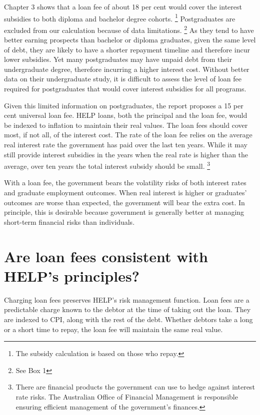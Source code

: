 \documentclass[embargoed]{grattan}
\begin{document}
Chapter 3 shows that a loan fee of about 18 per cent would cover the interest subsidies to both diploma and bachelor degree cohorts.%
\footnote{The subsidy calculation is based on those who repay.} Postgraduates are excluded from our calculation because of data limitations.%
\footnote{See Box 1} As they tend to have better earning prospects than bachelor or diploma graduates, given the same level of debt, they are likely to have a shorter repayment timeline and therefore incur lower subsidies.
Yet many postgraduates may have unpaid debt from their undergraduate degree, therefore incurring a higher interest cost.
Without better data on their undergraduate study, it is difficult to assess the level of loan fee required for postgraduates that would cover interest subsidies for all programs.

Given this limited information on postgraduates, the report proposes a 15 per cent universal loan fee.
HELP loans, both the principal and the loan fee, would be indexed to inflation to maintain their real values.
The loan fees should cover most, if not all, of the interest cost.
The rate of the loan fee relies on the average real interest rate the government has paid over the last ten years.
While it may still provide interest subsidies in the years when the real rate is higher than the average, over ten years the total interest subsidy should be small.%
\footnote{There are financial products the government can use to hedge against interest rate risks.
The Australian Office of Financial Management is responsible ensuring efficient management of the government's finances.}

With a loan fee, the government bears the volatility risks of both interest rates and graduate employment outcomes.
When real interest is higher or graduates' outcomes are worse than expected, the government will bear the extra cost.
In principle, this is desirable because government is generally better at managing short-term financial risks than individuals.

\section{Are loan fees consistent with HELP's principles? }\label{are-loan-fees-consistent-with-helps-principles}

Charging loan fees preserves HELP's risk management function.
Loan fees are a predictable charge known to the debtor at the time of taking out the loan.
They are indexed to \gls{CPI}, along with the rest of the debt.
Whether debtors take a long or a short time to repay, the loan fee will maintain the same real value.
\end{document}
